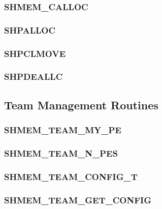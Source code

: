 \documentclass[10pt]{book}
\begin{document}
\subsubsection{\textbf{SHMEM\_CALLOC}}\label{subsec:shmem_calloc}


\subsubsection{\textbf{SHPALLOC}}\label{subsec:shpalloc}


\subsubsection{\textbf{SHPCLMOVE}}\label{subsec:shpclmove}


\subsubsection{\textbf{SHPDEALLC}}\label{subsec:shpdeallc}





\color{Green}
\subsection{Team Management Routines}\label{subsec:team}


\subsubsection{\textbf{SHMEM\_TEAM\_MY\_PE}}\label{subsec:shmem_team_my_pe}


\subsubsection{\textbf{SHMEM\_TEAM\_N\_PES}}\label{subsec:shmem_team_n_pes}


\subsubsection{\textbf{SHMEM\_TEAM\_CONFIG\_T}}
\label{subsec:shmem_team_config_t}


\subsubsection{\textbf{SHMEM\_TEAM\_GET\_CONFIG}}\label{subsec:shmem_team_get_config}

\end{document}
